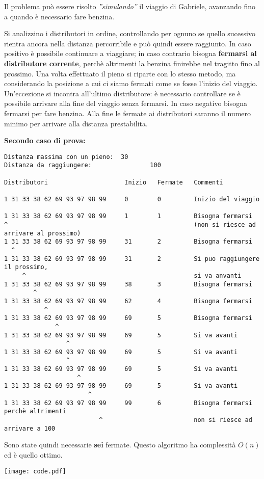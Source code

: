 

\SolN

Il problema può essere risolto \textit{''simulando''} il viaggio di Gabriele, avanzando fino a quando è necessario fare benzina.


Si analizzino i distributori in ordine, controllando per ognuno se quello sucessivo rientra ancora nella distanza percorribile e può quindi essere raggiunto.\newline
In caso positivo è possibile continuare a viaggiare; in caso contrario bisogna \textbf{fermarsi al distributore corrente}, perchè altrimenti la benzina finirebbe nel tragitto fino al prossimo.\newline
Una volta effettuato il pieno si riparte con lo stesso metodo, ma considerando la posizione a cui ci siamo fermati come se fosse l'inizio del viaggio.\newline
Un'eccezione si incontra all'ultimo distributore: è necessario controllare se è possibile arrivare alla fine del viaggio senza fermarsi. In caso negativo bisogna fermarsi per fare benzina.\newline
Alla fine le fermate ai distributori saranno il numero minimo per arrivare alla distanza prestabilita.

\textbf{Secondo caso di prova:}

\begin{verbatim}
Distanza massima con un pieno:	30
Distanza da raggiungere:				100

Distributori                     Inizio	  Fermate   Commenti

1 31 33 38 62 69 93 97 98 99     0        0         Inizio del viaggio

1 31 33 38 62 69 93 97 98 99     1        1         Bisogna fermarsi
^                                                   (non si riesce ad arrivare al prossimo)
1 31 33 38 62 69 93 97 98 99     31       2         Bisogna fermarsi
  ^
1 31 33 38 62 69 93 97 98 99     31       2         Si puo raggiungere il prossimo,
     ^                                              si va anvanti
1 31 33 38 62 69 93 97 98 99     38       3         Bisogna fermarsi
        ^
1 31 33 38 62 69 93 97 98 99     62       4         Bisogna fermarsi
           ^
1 31 33 38 62 69 93 97 98 99     69       5         Bisogna fermarsi
              ^
1 31 33 38 62 69 93 97 98 99     69       5         Si va avanti
                 ^
1 31 33 38 62 69 93 97 98 99     69       5         Si va avanti
                 ^
1 31 33 38 62 69 93 97 98 99     69       5         Si va avanti
                    ^
1 31 33 38 62 69 93 97 98 99     69       5         Si va avanti
                       ^
1 31 33 38 62 69 93 97 98 99     99       6         Bisogna fermarsi perchè altrimenti
                          ^                         non si riesce ad arrivare a 100
\end{verbatim}
Sono state quindi necessarie \textbf{sei} fermate.
Questo algoritmo ha complessità $O(n)$ ed è quello ottimo.

\Codice

\texttt{[image: code.pdf]}